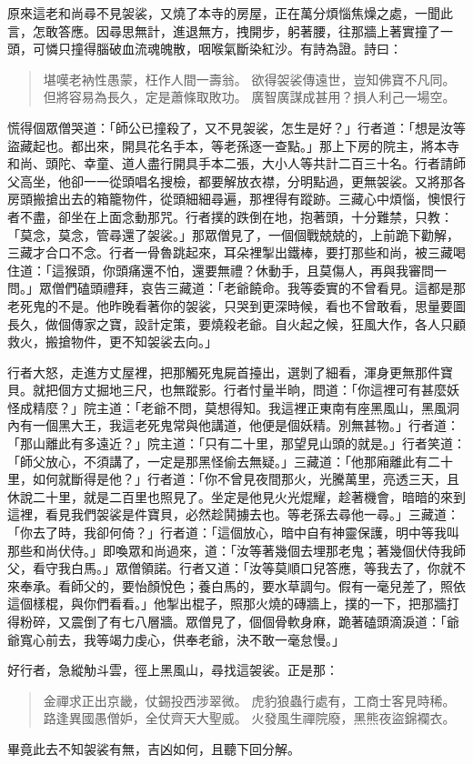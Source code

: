 原來這老和尚尋不見袈裟，又燒了本寺的房屋，正在萬分煩惱焦燥之處，一聞此言，怎敢答應。因尋思無計，進退無方，拽開步，躬著腰，往那牆上著實撞了一頭，可憐只撞得腦破血流魂魄散，咽喉氣斷染紅沙。有詩為證。詩曰：
\begin{quote}
堪嘆老衲性愚蒙，枉作人間一壽翁。
欲得袈裟傳遠世，豈知佛寶不凡同。
但將容易為長久，定是蕭條取敗功。
廣智廣謀成甚用？損人利己一場空。
\end{quote}

慌得個眾僧哭道：「師公已撞殺了，又不見袈裟，怎生是好？」行者道：「想是汝等盜藏起也。都出來，開具花名手本，等老孫逐一查點。」那上下房的院主，將本寺和尚、頭陀、幸童、道人盡行開具手本二張，大小人等共計二百三十名。行者請師父高坐，他卻一一從頭唱名搜檢，都要解放衣襟，分明點過，更無袈裟。又將那各房頭搬搶出去的箱籠物件，從頭細細尋遍，那裡得有蹤跡。三藏心中煩惱，懊恨行者不盡，卻坐在上面念動那咒。行者撲的跌倒在地，抱著頭，十分難禁，只教：「莫念，莫念，管尋還了袈裟。」那眾僧見了，一個個戰兢兢的，上前跪下勸解，三藏才合口不念。行者一骨魯跳起來，耳朵裡掣出鐵棒，要打那些和尚，被三藏喝住道：「這猴頭，你頭痛還不怕，還要無禮？休動手，且莫傷人，再與我審問一問。」眾僧們磕頭禮拜，哀告三藏道：「老爺饒命。我等委實的不曾看見。這都是那老死鬼的不是。他昨晚看著你的袈裟，只哭到更深時候，看也不曾敢看，思量要圖長久，做個傳家之寶，設計定策，要燒殺老爺。自火起之候，狂風大作，各人只顧救火，搬搶物件，更不知袈裟去向。」

行者大怒，走進方丈屋裡，把那觸死鬼屍首擡出，選剝了細看，渾身更無那件寶貝。就把個方丈掘地三尺，也無蹤影。行者忖量半晌，問道：「你這裡可有甚麼妖怪成精麼？」院主道：「老爺不問，莫想得知。我這裡正東南有座黑風山，黑風洞內有一個黑大王，我這老死鬼常與他講道，他便是個妖精。別無甚物。」行者道：「那山離此有多遠近？」院主道：「只有二十里，那望見山頭的就是。」行者笑道：「師父放心，不須講了，一定是那黑怪偷去無疑。」三藏道：「他那廂離此有二十里，如何就斷得是他？」行者道：「你不曾見夜間那火，光騰萬里，亮透三天，且休說二十里，就是二百里也照見了。坐定是他見火光焜耀，趁著機會，暗暗的來到這裡，看見我們袈裟是件寶貝，必然趁鬨擄去也。等老孫去尋他一尋。」三藏道：「你去了時，我卻何倚？」行者道：「這個放心，暗中自有神靈保護，明中等我叫那些和尚伏侍。」即喚眾和尚過來，道：「汝等著幾個去埋那老鬼；著幾個伏侍我師父，看守我白馬。」眾僧領諾。行者又道：「汝等莫順口兒答應，等我去了，你就不來奉承。看師父的，要怡顏悅色；養白馬的，要水草調勻。假有一毫兒差了，照依這個樣棍，與你們看看。」他掣出棍子，照那火燒的磚牆上，撲的一下，把那牆打得粉碎，又震倒了有七八層牆。眾僧見了，個個骨軟身麻，跪著磕頭滴淚道：「爺爺寬心前去，我等竭力虔心，供奉老爺，決不敢一毫怠慢。」

好行者，急縱觔斗雲，徑上黑風山，尋找這袈裟。正是那：
\begin{quote}
金禪求正出京畿，仗錫投西涉翠微。
虎豹狼蟲行處有，工商士客見時稀。
路逢異國愚僧妒，全仗齊天大聖威。
火發風生禪院廢，黑熊夜盜錦襴衣。
\end{quote}

畢竟此去不知袈裟有無，吉凶如何，且聽下回分解。
